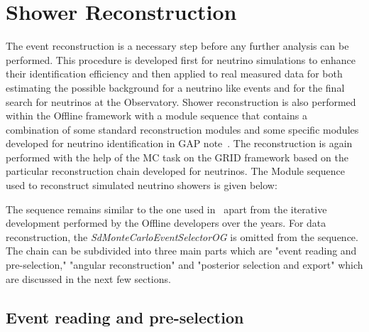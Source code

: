 \section{Shower Reconstruction}
\label{sec:reco}

The event reconstruction is a necessary step before any further analysis can be performed. This procedure is developed first for neutrino simulations to enhance their identification efficiency and then applied to real measured data for both estimating the possible background for a neutrino like events and for the final search for neutrinos at the Observatory. Shower reconstruction is also performed within the Offline framework with a module sequence that contains a combination of some standard reconstruction modules and some specific modules developed for neutrino identification in GAP note~\cite{}. The reconstruction is again performed with the help of the MC task on the GRID framework based on the particular reconstruction chain developed for neutrinos. The Module sequence used to reconstruct simulated neutrino showers is given below:


The sequence remains similar to the one used in~\cite{} apart from the iterative development performed by the Offline developers over the years. For data reconstruction, the \textit{SdMonteCarloEventSelectorOG} is omitted from the sequence. The chain can be subdivided into three main parts which are "event reading and pre-selection," "angular reconstruction" and "posterior selection and export" which are discussed in the next few sections.

\subsection{Event reading and pre-selection}
\label{subsec:reco_presel}

